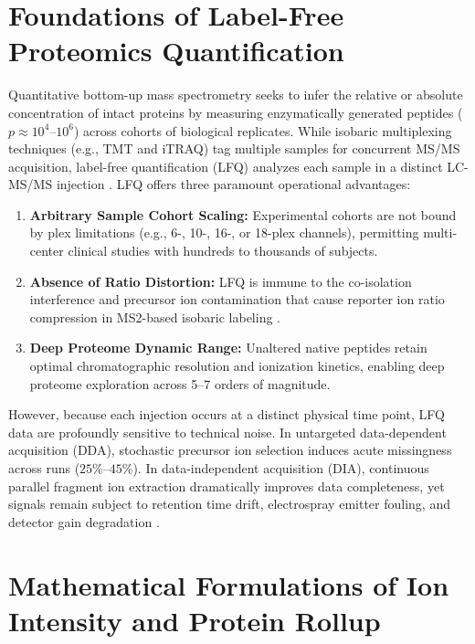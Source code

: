 \documentclass[11pt,oneside]{book}
\begin{document}
\section{Foundations of Label-Free Proteomics Quantification}

Quantitative bottom-up mass spectrometry seeks to infer the relative or absolute concentration of intact proteins by measuring enzymatically generated peptides ($p \approx 10^4$--$10^6$) across cohorts of biological replicates. While isobaric multiplexing techniques (e.g., TMT and iTRAQ) tag multiple samples for concurrent MS/MS acquisition, label-free quantification (LFQ) analyzes each sample in a distinct LC-MS/MS injection \cite{cox2014maxlfq}. LFQ offers three paramount operational advantages:
\begin{enumerate}
    \item \textbf{Arbitrary Sample Cohort Scaling:} Experimental cohorts are not bound by plex limitations (e.g., 6-, 10-, 16-, or 18-plex channels), permitting multi-center clinical studies with hundreds to thousands of subjects.
    \item \textbf{Absence of Ratio Distortion:} LFQ is immune to the co-isolation interference and precursor ion contamination that cause reporter ion ratio compression in MS2-based isobaric labeling \cite{ting2011sps}.
    \item \textbf{Deep Proteome Dynamic Range:} Unaltered native peptides retain optimal chromatographic resolution and ionization kinetics, enabling deep proteome exploration across 5--7 orders of magnitude.
\end{enumerate}

However, because each injection occurs at a distinct physical time point, LFQ data are profoundly sensitive to technical noise. In untargeted data-dependent acquisition (DDA), stochastic precursor ion selection induces acute missingness across runs ($25\%$--$45\%$). In data-independent acquisition (DIA), continuous parallel fragment ion extraction dramatically improves data completeness, yet signals remain subject to retention time drift, electrospray emitter fouling, and detector gain degradation \cite{bruderer2017optimization, demichev2020dia}. 

\section{Mathematical Formulations of Ion Intensity and Protein Rollup}
\end{document}
